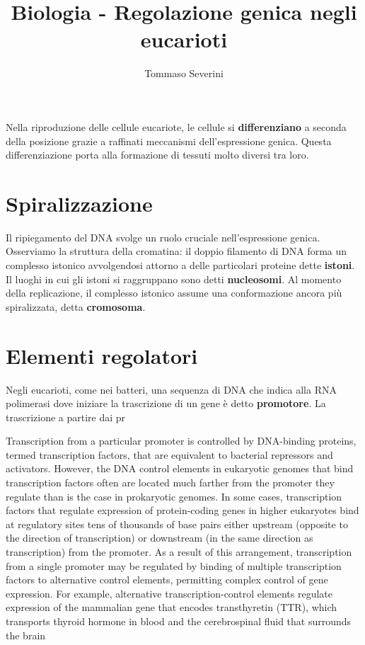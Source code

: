 \documentclass[10pt,a4paper]{article}
\author{Tommaso Severini}
\title{Biologia - Regolazione genica negli eucarioti}
\begin{document}
	\maketitle
	
	Nella riproduzione delle cellule eucariote, le cellule si \textbf{differenziano} a seconda della posizione grazie a raffinati meccanismi dell'espressione genica. Questa differenziazione porta alla formazione di tessuti molto diversi tra loro.
	
	\section{Spiralizzazione}
	
	Il ripiegamento del DNA svolge un ruolo cruciale nell'espressione genica. Osserviamo la struttura della cromatina: il doppio filamento di DNA forma un complesso istonico avvolgendosi attorno a delle particolari proteine dette \textbf{istoni}. Il luoghi in cui gli istoni si raggruppano sono detti \textbf{nucleosomi}. Al momento della replicazione, il complesso istonico assume una conformazione ancora più spiralizzata, detta \textbf{cromosoma}.
	
	\section{Elementi regolatori}
	
	Negli eucarioti, come nei batteri, una sequenza di DNA che indica alla RNA polimerasi dove iniziare la trascrizione di un gene è detto \textbf{promotore}. La trascrizione a partire dai pr
	
	Transcription from a particular promoter
	is controlled by DNA-binding proteins, termed transcription
	factors, that are equivalent to bacterial repressors
	and activators. However, the DNA control elements in eukaryotic
	genomes that bind transcription factors often are located
	much farther from the promoter they regulate than is
	the case in prokaryotic genomes. In some cases, transcription
	factors that regulate expression of protein-coding genes in
	higher eukaryotes bind at regulatory sites tens of thousands of
	base pairs either upstream (opposite to the direction of transcription)
	or downstream (in the same direction as transcription)
	from the promoter. As a result of this arrangement,
	transcription from a single promoter may be regulated by
	binding of multiple transcription factors to alternative control
	elements, permitting complex control of gene expression.
	For example, alternative transcription-control elements
	regulate expression of the mammalian gene that encodes
	transthyretin (TTR), which transports thyroid hormone in
	blood and the cerebrospinal fluid that surrounds the brain 
	
\end{document}
